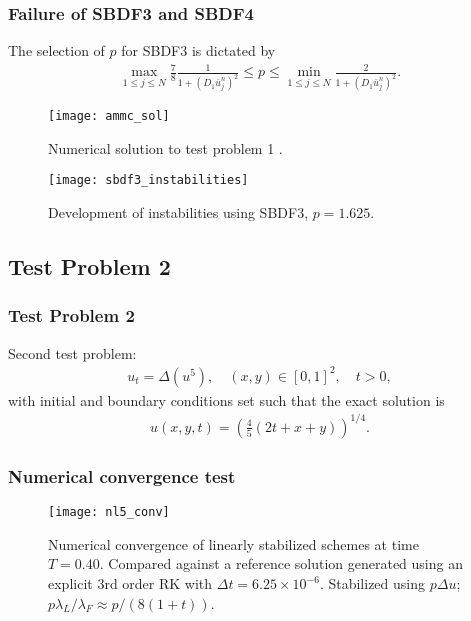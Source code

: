 \documentclass[hyperref={pdfpagelabels=false}]{beamer}
\begin{document}
\begin{frame}
	\frametitle{Failure of SBDF3 and SBDF4} 
The selection of $p$ for SBDF3 is dictated by 
	\begin{align*}
		\max_{1\leq j\leq N} \frac{7}{8} \frac{1}{1 + (D_1 \bar u^n_j)^2} 
		\leq p
		\leq \min_{1\leq j\leq N} \frac{2}{1 + (D_1 \bar u^n_j)^2}.
	\end{align*}
	\begin{figure}
		\centering 
\begin{minipage}{0.45\textwidth} 
	\centering
        \texttt{[image: ammc\_sol]}
	\caption{Numerical solution to test problem 1 .}
\end{minipage}
\begin{minipage}{0.45\textwidth} 
	\centering
	\texttt{[image: sbdf3\_instabilities]}
	\caption{Development of instabilities using SBDF3, $p=1.625$.}
\end{minipage} 
	\end{figure}
\end{frame}

\subsection{Test Problem 2}
\begin{frame}
	\frametitle{Test Problem 2} 
Second test problem: 
	\begin{align*}
		u_t = \Delta(u^5), 
		\quad (x,y) \in [0,1]^2, \quad t > 0, 
	\end{align*}
with initial and boundary conditions set such that the exact solution is 
	\begin{align*}
		u(x,y,t) = \left(\frac{4}{5}(2t+x+y) \right)^{1/4}.
	\end{align*}
\end{frame}

\begin{frame}
	\frametitle{Numerical convergence test}
	\begin{figure}[t]
		\centering
		\texttt{[image: nl5\_conv]}
		\caption{Numerical convergence of linearly stabilized schemes at time $T=0.40$. Compared against a reference solution generated using an explicit 3rd order RK with $\Delta t = 6.25\times 10^{-6}$. Stabilized using $p\Delta u$; $p\lambda_L / \lambda_F \approx p/(8(1+t))$.}
	\end{figure} 
\end{frame}
\end{document}
